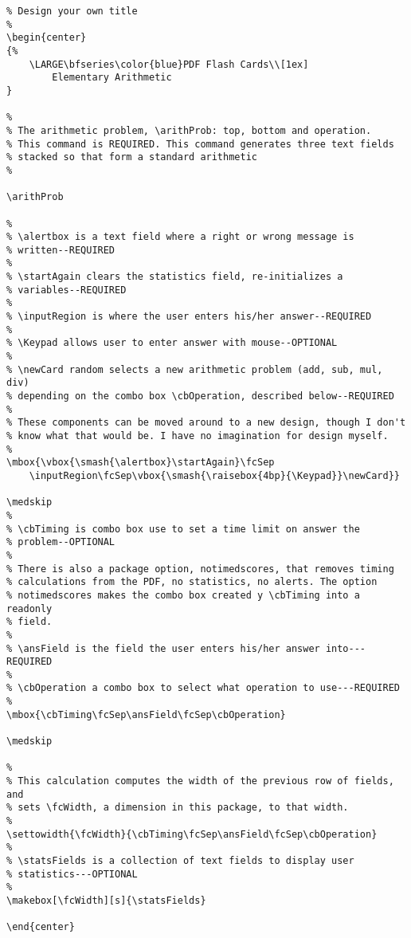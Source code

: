 \documentclass{article}
\begin{document}
\begin{Verbatim}[fontsize=\small]
%
% Design your own title
%
\begin{center}
{%
    \LARGE\bfseries\color{blue}PDF Flash Cards\\[1ex]
        Elementary Arithmetic
}

%
% The arithmetic problem, \arithProb: top, bottom and operation.
% This command is REQUIRED. This command generates three text fields
% stacked so that form a standard arithmetic
%

\arithProb

%
% \alertbox is a text field where a right or wrong message is
% written--REQUIRED
%
% \startAgain clears the statistics field, re-initializes a
% variables--REQUIRED
%
% \inputRegion is where the user enters his/her answer--REQUIRED
%
% \Keypad allows user to enter answer with mouse--OPTIONAL
%
% \newCard random selects a new arithmetic problem (add, sub, mul, div)
% depending on the combo box \cbOperation, described below--REQUIRED
%
% These components can be moved around to a new design, though I don't
% know what that would be. I have no imagination for design myself.
%
\mbox{\vbox{\smash{\alertbox}\startAgain}\fcSep
    \inputRegion\fcSep\vbox{\smash{\raisebox{4bp}{\Keypad}}\newCard}}

\medskip
%
% \cbTiming is combo box use to set a time limit on answer the
% problem--OPTIONAL
%
% There is also a package option, notimedscores, that removes timing
% calculations from the PDF, no statistics, no alerts. The option
% notimedscores makes the combo box created y \cbTiming into a readonly
% field.
%
% \ansField is the field the user enters his/her answer into---REQUIRED
%
% \cbOperation a combo box to select what operation to use---REQUIRED
%
\mbox{\cbTiming\fcSep\ansField\fcSep\cbOperation}

\medskip

%
% This calculation computes the width of the previous row of fields, and
% sets \fcWidth, a dimension in this package, to that width.
%
\settowidth{\fcWidth}{\cbTiming\fcSep\ansField\fcSep\cbOperation}
%
% \statsFields is a collection of text fields to display user
% statistics---OPTIONAL
%
\makebox[\fcWidth][s]{\statsFields}

\end{center}
\end{Verbatim}
\end{document}
